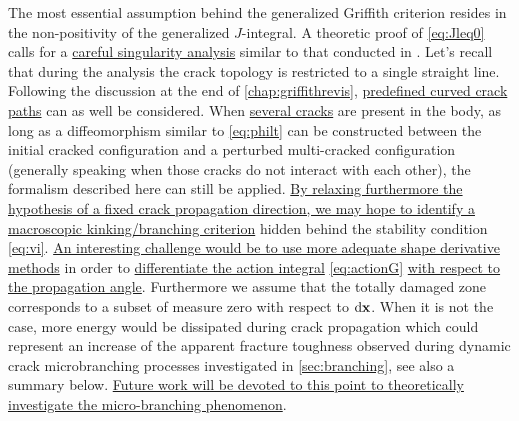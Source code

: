 The most essential assumption behind the generalized Griffith criterion resides in the non-positivity of the generalized $J$-integral. A theoretic proof of \cref{eq:Jleq0} calls for a \uline{careful singularity analysis} similar to that conducted in \cite{SicsicMarigo:2013}. Let's recall that during the analysis the crack topology is restricted to a single straight line. Following the discussion at the end of \cref{chap:griffithrevis}, \uline{predefined curved crack paths} can as well be considered. When \uline{several cracks} are present in the body, as long as a diffeomorphism similar to \eqref{eq:philt} can be constructed between the initial cracked configuration and a perturbed multi-cracked configuration (generally speaking when those cracks do not interact with each other), the formalism described here can still be applied. \uline{By relaxing furthermore the hypothesis of a fixed crack propagation direction, we may hope to identify a macroscopic kinking/branching criterion} hidden behind the stability condition \eqref{eq:vi}. \uline{An interesting challenge would be to use more adequate shape derivative methods} \cite{Hintermuller:2011} in order to \uline{differentiate the action integral} \eqref{eq:actionG} \uline{with respect to the propagation angle}. Furthermore we assume that the totally damaged zone corresponds to a subset of measure zero with respect to $\md\vec{x}$. When it is not the case, more energy would be dissipated during crack propagation which could represent an increase of the apparent fracture toughness observed during dynamic crack microbranching processes investigated in \cref{sec:branching}, see also a summary below. \uline{Future work will be devoted to this point to theoretically investigate the micro-branching phenomenon}.

